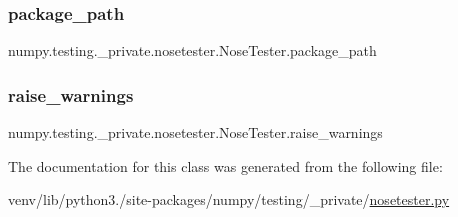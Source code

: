 \subsubsection{\texorpdfstring{package\+\_\+path}{package\_path}}
{\footnotesize\ttfamily numpy.\+testing.\+\_\+private.\+nosetester.\+Nose\+Tester.\+package\+\_\+path}

\mbox{\label{classnumpy_1_1testing_1_1__private_1_1nosetester_1_1NoseTester_a6ea4848c8dc9cde3964f7e58298831a8}} 
\subsubsection{\texorpdfstring{raise\+\_\+warnings}{raise\_warnings}}
{\footnotesize\ttfamily numpy.\+testing.\+\_\+private.\+nosetester.\+Nose\+Tester.\+raise\+\_\+warnings}



The documentation for this class was generated from the following file\+:\begin{DoxyCompactItemize}
\item 
venv/lib/python3./site-\/packages/numpy/testing/\+\_\+private/\hyperlink{nosetester_8py}{nosetester.\+py}\end{DoxyCompactItemize}
